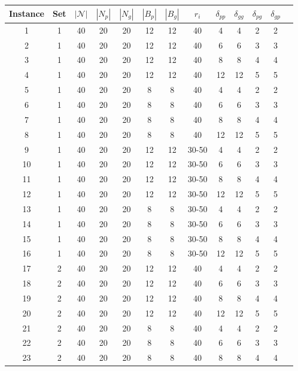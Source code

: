 \documentclass[11pt]{article}
\begin{document}
\begin{itemize}
\begin{table}[t!]
    \footnotesize
    \centering
\begin{tabular}{@{}ccccccccccccc@{}}
\toprule
Instance & Set & $|\mathcal{N}|$ & $|N_p|$ & $|N_g|$ & $|B_p|$ & $|B_g|$ & $r_i$ & $\delta_{pp}$ & $\delta_{gg}$ & $\delta_{pg}$ & $\delta_{gp}$ \\ \midrule \hline
1 & 1 & 40 & 20 & 20 & 12 & 12 & 40 & 4 & 4 & 2 & 2 \\
2 & 1 & 40 & 20 & 20 & 12 & 12 & 40 & 6 & 6 & 3 & 3 \\
3 & 1 & 40 & 20 & 20 & 12 & 12 & 40 & 8 & 8 & 4 & 4 \\
4 & 1 & 40 & 20 & 20 & 12 & 12 & 40 & 12 & 12 & 5 & 5 \\\hline
5 & 1 & 40 & 20 & 20 & 8 & 8 & 40 & 4 & 4 & 2 & 2 \\
6 & 1 & 40 & 20 & 20 & 8 & 8 & 40 & 6 & 6 & 3 & 3 \\
7 & 1 & 40 & 20 & 20 & 8 & 8 & 40 & 8 & 8 & 4 & 4 \\
8 & 1 & 40 & 20 & 20 & 8 & 8 & 40 & 12 & 12 & 5 & 5 \\\hline
9 & 1 & 40 & 20 & 20 & 12 & 12 & 30-50 & 4 & 4 & 2 & 2 \\
10 & 1 & 40 & 20 & 20 & 12 & 12 & 30-50 & 6 & 6 & 3 & 3 \\
11 & 1 & 40 & 20 & 20 & 12 & 12 & 30-50 & 8 & 8 & 4 & 4 \\
12 & 1 & 40 & 20 & 20 & 12 & 12 & 30-50 & 12 & 12 & 5 & 5 \\\hline
13 & 1 & 40 & 20 & 20 & 8 & 8 & 30-50 & 4 & 4 & 2 & 2 \\
14 & 1 & 40 & 20 & 20 & 8 & 8 & 30-50 & 6 & 6 & 3 & 3 \\
15 & 1 & 40 & 20 & 20 & 8 & 8 & 30-50 & 8 & 8 & 4 & 4 \\
16 & 1 & 40 & 20 & 20 & 8 & 8 & 30-50 & 12 & 12 & 5 & 5 \\\hline\hline
17 & 2 & 40 & 20 & 20 & 12 & 12 & 40 & 4 & 4 & 2 & 2 \\
18 & 2 & 40 & 20 & 20 & 12 & 12 & 40 & 6 & 6 & 3 & 3 \\
19 & 2 & 40 & 20 & 20 & 12 & 12 & 40 & 8 & 8 & 4 & 4 \\
20 & 2 & 40 & 20 & 20 & 12 & 12 & 40 & 12 & 12 & 5 & 5 \\\hline
21 & 2 & 40 & 20 & 20 & 8 & 8 & 40 & 4 & 4 & 2 & 2 \\
22 & 2 & 40 & 20 & 20 & 8 & 8 & 40 & 6 & 6 & 3 & 3 \\
23 & 2 & 40 & 20 & 20 & 8 & 8 & 40 & 8 & 8 & 4 & 4 \\

\end{tabular}
\end{table}
\end{itemize}
\end{document}
